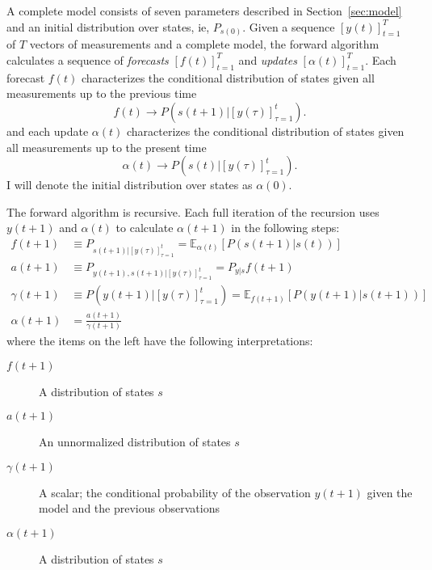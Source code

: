 \documentclass[12pt]{article}
\newcommand{\field}[1]{\mathbb{#1}}
\newcommand{\EV}[2]{\field{E}_{#1}\left[#2\right]}
\newcommand{\ti}[2]{{#1}{(#2)}}                         %
\newcommand{\ts}[4]{{\left[ #1(#2) \right]}_{#3}^{#4}} %
\begin{document}
A complete model consists of seven parameters described in
Section~\ref{sec:model} and an initial distribution over states, ie,
$P_{s(0)}$.  Given a sequence $\ts{y}{t}{t=1}{T}$ of $T$ vectors of
measurements and a complete model, the forward algorithm calculates a
sequence of \emph{forecasts} $\ts{f}{t}{t=1}{T}$ and \emph{updates}
$\ts{\alpha}{t}{t=1}{T}$.  Each forecast $\ti{f}{t}$ characterizes the
conditional distribution of states given all measurements up to the
previous time
\begin{equation*}
  \ti{f}{t} \rightarrow P(\ti{s}{t+1}|\ts{y}{\tau}{\tau=1}{t}).
\end{equation*}
and each update $\ti{\alpha}{t}$ characterizes the conditional
distribution of states given all measurements up to the present time
\begin{equation*}
  \ti{\alpha}{t} \rightarrow P(\ti{s}{t}|\ts{y}{\tau}{\tau=1}{t}).
\end{equation*}
I will denote the initial distribution over states as
$\ti{\alpha}{0}$.

The forward algorithm is recursive.  Each full iteration of the
recursion uses $\ti{y}{t+1}$ and $\ti{\alpha}{t}$ to calculate
$\ti{\alpha}{t+1}$ in the following steps:
\begin{subequations}
  \label{eq:Forward}
\begin{align}
  \label{eq:f1}
  \ti{f}{t+1} &\equiv P_{\ti{s}{t+1}|\ts{y}{\tau}{\tau=1}{t}} =
  \EV{\ti{\alpha}{t}}{P(\ti{s}{t+1}|\ti{s}{t})} \\ 
  \label{eq:f2}
  \ti{a}{t+1} &\equiv
  P_{\ti{y}{t+1},\ti{s}{t+1}|\ts{y}{\tau}{\tau=1}{t}} = P_{y|s}
  \ti{f}{t+1} \\
  \label{eq:f3}
  \ti{\gamma}{t+1} &\equiv P(\ti{y}{t+1}|\ts{y}{\tau}{\tau=1}{t}) = \EV{\ti{f}{t+1}}{P(\ti{y}{t+1}|\ti{s}{t+1})} \\
  \label{eq:f4}
  \ti{\alpha}{t+1} &= \frac{\ti{a}{t+1}}{\ti{\gamma}{t+1}}
\end{align}
\end{subequations}
where the items on the left have the following interpretations:
\begin{description}
\item[$\ti{f}{t+1}$] A distribution of states $s$
\item[$\ti{a}{t+1}$] An unnormalized distribution of states $s$
\item[$\ti{\gamma}{t+1}$] A scalar; the conditional probability of the
  observation $\ti{y}{t+1}$ given the model and the previous observations
\item[$\ti{\alpha}{t+1}$] A distribution of states $s$
\end{description}
\end{document}
